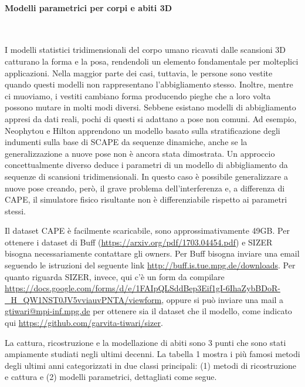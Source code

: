 \paragraph{Modelli parametrici per corpi e abiti 3D}~

I modelli statistici tridimensionali del corpo umano ricavati dalle scansioni 3D catturano la forma e la posa, rendendoli un elemento fondamentale per molteplici applicazioni.
Nella maggior parte dei casi, tuttavia, le persone sono vestite quando questi modelli non rappresentano l’abbigliamento stesso.
Inoltre, mentre ci muoviamo, i vestiti cambiano forma producendo pieghe che a loro volta possono mutare in molti modi diversi.
Sebbene esistano modelli di abbigliamento appresi da dati reali, pochi di questi si adattano a pose non comuni. Ad esempio, Neophytou e Hilton apprendono un modello basato sulla stratificazione degli indumenti sulla base di SCAPE da sequenze dinamiche, anche se la generalizzazione a nuove pose non è ancora stata dimostrata.
Un approccio concettualmente diverso deduce i parametri di un modello di abbigliamento da sequenze di scansioni tridimensionali.
In questo caso è possibile generalizzare a nuove pose creando, però, il grave problema dell’interferenza e, a differenza di CAPE, il simulatore fisico risultante non è differenziabile rispetto ai parametri stessi.

\medskip

Il dataset CAPE è facilmente scaricabile, sono approssimativamente 49GB.
Per ottenere i dataset di Buff (\url{https://arxiv.org/pdf/1703.04454.pdf}) e SIZER bisogna necessariamente contattare gli owners.
Per Buff bisogna inviare una email seguendo le istruzioni del seguente link \url{http://buff.is.tue.mpg.de/downloads}. Per quanto riguarda SIZER, invece, qui c'è un form da compilare \url{https://docs.google.com/forms/d/e/1FAIpQLSddBep3Eif1gI-6IhaZybBDoR-_H_QW1NST0JV5vviauvPNTA/viewform}, oppure si può inviare una mail a \url{gtiwari@mpi-inf.mpg.de} per ottenere sia il dataset che il modello, come indicato qui \url{https://github.com/garvita-tiwari/sizer}.

\medskip

La cattura, ricostruzione e la modellazione di abiti sono 3 punti che sono stati ampiamente studiati negli ultimi decenni.
La tabella 1 mostra i più famosi metodi degli ultimi anni categorizzati in due classi principali: (1) metodi di ricostruzione e cattura e (2) modelli parametrici, dettagliati come segue.

\medskip

